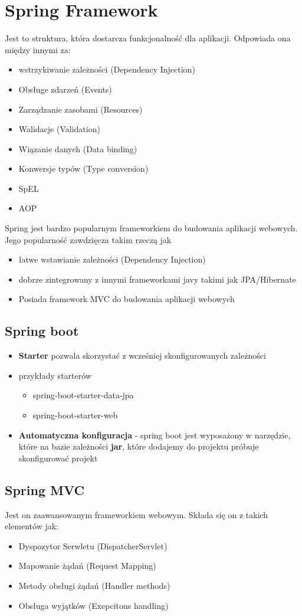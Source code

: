\section{Spring Framework \cite{HK}}
Jest to struktura, która dostarcza funkcjonalność dla aplikacji. Odpowiada ona między innymi za: 
\begin{itemize}
    \item wstrzykiwanie zależności (Dependency Injection)
    \item Obsługe zdarzeń (Events)
    \item Zarządzanie zasobami (Resources)
    \item Walidacje (Validation)
    \item Wiązanie danych (Data binding)
    \item Konwersje typów (Type conversion)
    \item SpEL
    \item AOP
\end{itemize}
Spring jest bardzo popularnym frameworkiem do budowania aplikacji webowych.
\\Jego popularność zawdzięcza takim rzeczą jak
\begin{itemize}
    \item łatwe wstawianie zależności (Dependency Injection)
    \item dobrze zintegrowany z innymi frameworkami javy takimi jak JPA/Hibernate
    \item Posiada framework MVC do budowania aplikacji webowych
\end{itemize}
\subsection*{Spring boot}
\begin{itemize}
    \item \textbf{Starter} pozwala skorzystać z wcześniej skonfigurowanych zależności 
    \item przykłady starterów
    \begin{itemize}
        \item spring-boot-starter-data-jpa
        \item spring-boot-starter-web
    \end{itemize}
    \item \textbf{Automatyczna konfiguracja} - spring boot jest wyposażony w narzędzie, które na bazie zależności \textbf{jar}, które dodajemy do projektu próbuje skonfigurować projekt
\end{itemize}

\subsection*{Spring MVC}
Jest on zaawansowanym frameworkiem webowym. Składa się on z takich elementów jak:
\begin{itemize}
    \item Dyspozytor Serwletu (DispatcherServlet)
    \item Mapowanie żądań (Request Mapping)
    \item Metody obsługi żądań (Handler methods)
    \item Obsługa wyjątków (Exepcitons handling)
\end{itemize}